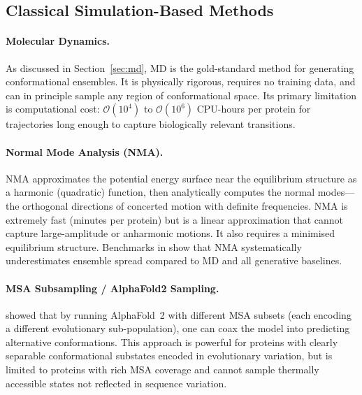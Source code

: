 \documentclass[12pt,a4paper]{article}
\begin{document}
\subsection{Classical Simulation-Based Methods}
\label{sec:classical}

\paragraph{Molecular Dynamics.}
As discussed in Section~\ref{sec:md}, MD is the gold-standard method for generating
conformational ensembles.  It is physically rigorous, requires no training data, and can
in principle sample any region of conformational space.  Its primary limitation is
computational cost: $\mathcal{O}(10^4)$ to $\mathcal{O}(10^6)$ CPU-hours per protein for
trajectories long enough to capture biologically relevant transitions.

\paragraph{Normal Mode Analysis (NMA).}
NMA \citep{case1994} approximates the potential energy surface near the equilibrium structure
as a harmonic (quadratic) function, then analytically computes the normal modes---the
orthogonal directions of concerted motion with definite frequencies.  NMA is extremely fast
(minutes per protein) but is a linear approximation that cannot capture large-amplitude
or anharmonic motions.  It also requires a minimised equilibrium structure.  Benchmarks in
\citet{jing2024alphaflow} show that NMA systematically underestimates ensemble spread
compared to MD and all generative baselines.

\paragraph{MSA Subsampling / AlphaFold2 Sampling.}
\citet{wayment2024} showed that by running AlphaFold~2 with different MSA subsets (each
encoding a different evolutionary sub-population), one can coax the model into predicting
alternative conformations.  This approach is powerful for proteins with clearly separable
conformational substates encoded in evolutionary variation, but is limited to proteins with
rich MSA coverage and cannot sample thermally accessible states not reflected in sequence
variation.

\end{document}
